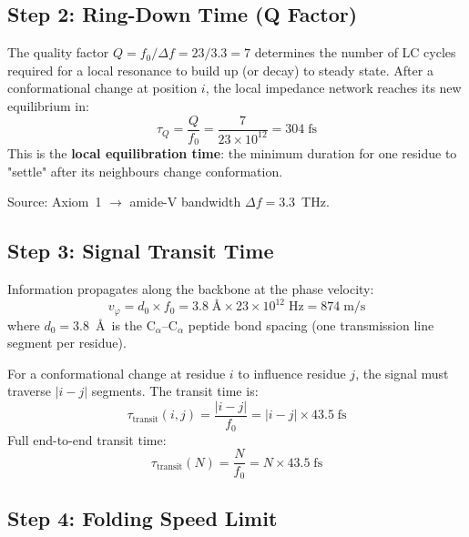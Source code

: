 \subsection{Step 2: Ring-Down Time (Q Factor)}
\label{sec:ringdown}

The quality factor $Q = f_0/\Delta f = 23/3.3 = 7$ determines the number of LC cycles required for a local resonance to build up (or decay) to steady state.
After a conformational change at position $i$, the local impedance network reaches its new equilibrium in:
\begin{equation}
    \tau_Q = \frac{Q}{f_0} = \frac{7}{23 \times 10^{12}} = 304\;\text{fs}
    \label{eq:tau_Q}
\end{equation}
This is the \textbf{local equilibration time}: the minimum duration for one residue to "settle" after its neighbours change conformation.

Source: Axiom~1 $\to$ amide-V bandwidth $\Delta f = 3.3$~THz.

\subsection{Step 3: Signal Transit Time}
\label{sec:transit}

Information propagates along the backbone at the phase velocity:
\begin{equation}
    v_\varphi = d_0 \times f_0 = 3.8\;\text{\AA} \times 23 \times 10^{12}\;\text{Hz} = 874\;\text{m/s}
    \label{eq:v_phase}
\end{equation}
where $d_0 = 3.8$~\AA\ is the C$_\alpha$--C$_\alpha$ peptide bond spacing (one transmission line segment per residue).

For a conformational change at residue $i$ to influence residue $j$, the signal must traverse $|i-j|$ segments.  The transit time is:
\begin{equation}
    \tau_\text{transit}(i,j) = \frac{|i-j|}{f_0} = |i-j| \times 43.5\;\text{fs}
    \label{eq:tau_transit}
\end{equation}
Full end-to-end transit time:
\begin{equation}
    \tau_\text{transit}(N) = \frac{N}{f_0} = N \times 43.5\;\text{fs}
    \label{eq:tau_transit_N}
\end{equation}

\subsection{Step 4: Folding Speed Limit}
\label{sec:speed_limit}

